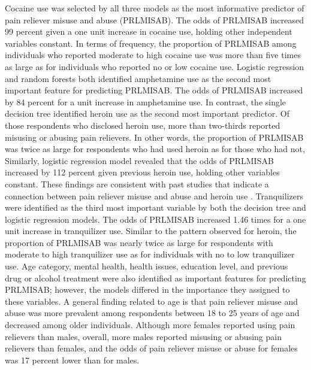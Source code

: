 \documentclass[sigconf]{acmart}
\begin{document}
Cocaine use was selected by all three models as the most informative predictor 
of pain reliever misuse and abuse (PRLMISAB). The odds of PRLMISAB increased 
99 percent given a one unit increase in cocaine use, holding other independent
variables constant. In terms of frequency, the proportion of PRLMISAB among 
individuals who reported moderate to high cocaine use was more than five times 
as large as for individuals who reported no or low cocaine use. Logistic 
regression and random forests both identified amphetamine use as the second 
most important feature for predicting PRLMISAB. The odds of PRLMISAB
increased by 84 percent for a unit increase in amphetamine use. In contrast, 
the single decision tree identified heroin use as the second most important 
predictor. Of those respondents who disclosed heroin use, more than two-thirds 
reported misusing or abusing pain relievers. In other words, the proportion of 
PRLMISAB was twice as large for respondents who had used heroin as for those 
who had not, Similarly, logistic regression model revealed that the odds of 
PRLMISAB increased by 112 percent given previous heroin use, holding other 
variables constant. These findings are consistent with past studies that
indicate a connection between pain reliever misuse and abuse and heroin use
\cite{jones13, jones15, muhuri13, unick13}. Tranquilizers were identified as 
the third most important variable by both the decision tree and logistic 
regression models. The odds of PRLMISAB increased 1.46 times for a one unit 
increase in tranquilizer use. Similar to the pattern observed for heroin, the 
proportion of PRLMISAB was nearly twice as large for respondents with moderate 
to high tranquilizer use as for individuals with no to low tranquilizer use. 
Age category, mental health, health issues, education level, and previous 
drug or alcohol treatment were also identified as important features for 
predicting PRLMISAB; however, the models differed in the importance they 
assigned to these variables. A general finding related to age is that pain 
reliever misuse and abuse was more prevalent among respondents between
18 to 25 years of age and decreased among older individuals. Although more 
females reported using pain relievers than males, overall, more males reported 
misusing or abusing pain relievers than females, and the odds of pain 
reliever misuse or abuse for females was 17 percent lower than for males. 

\end{document}
